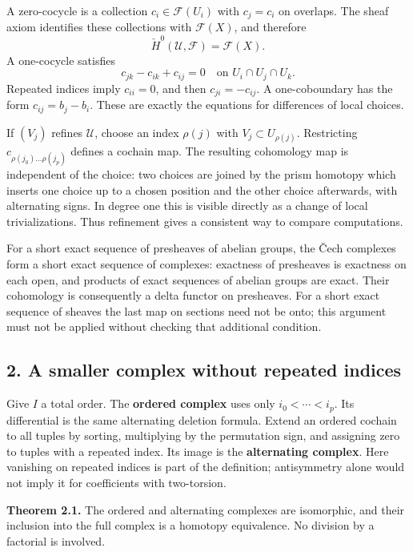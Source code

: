 \documentclass[11pt]{article}
\begin{document}
A zero-cocycle is a collection \(c_i\in\mathcal F(U_i)\) with
\(c_j=c_i\) on overlaps. The sheaf axiom identifies these collections
with \(\mathcal F(X)\), and therefore \[
\check H^0(\mathcal U,\mathcal F)=\mathcal F(X).
\] A one-cocycle satisfies \[
c_{jk}-c_{ik}+c_{ij}=0
\quad\text{on }U_i\cap U_j\cap U_k.
\] Repeated indices imply \(c_{ii}=0\), and then \(c_{ji}=-c_{ij}\). A
one-coboundary has the form \(c_{ij}=b_j-b_i\). These are exactly the
equations for differences of local choices.

If \((V_j)\) refines \(\mathcal U\), choose an index \(\rho(j)\) with
\(V_j\subset U_{\rho(j)}\). Restricting \(c_{\rho(j_0)\ldots\rho(j_p)}\)
defines a cochain map. The resulting cohomology map is independent of
the choice: two choices are joined by the prism homotopy which inserts
one choice up to a chosen position and the other choice afterwards, with
alternating signs. In degree one this is visible directly as a change of
local trivializations. Thus refinement gives a consistent way to compare
computations.

For a short exact sequence of presheaves of abelian groups, the Čech
complexes form a short exact sequence of complexes: exactness of
presheaves is exactness on each open, and products of exact sequences of
abelian groups are exact. Their cohomology is consequently a delta
functor on presheaves. For a short exact sequence of sheaves the last
map on sections need not be onto; this argument must not be applied
without checking that additional condition.

\subsection{2. A smaller complex without repeated
indices}\label{a-smaller-complex-without-repeated-indices}

Give \(I\) a total order. The \textbf{ordered complex} uses only
\(i_0<\cdots<i_p\). Its differential is the same alternating deletion
formula. Extend an ordered cochain to all tuples by sorting, multiplying
by the permutation sign, and assigning zero to tuples with a repeated
index. Its image is the \textbf{alternating complex}. Here vanishing on
repeated indices is part of the definition; antisymmetry alone would not
imply it for coefficients with two-torsion.

\textbf{Theorem 2.1.} The ordered and alternating complexes are
isomorphic, and their inclusion into the full complex is a homotopy
equivalence. No division by a factorial is involved.
\end{document}
